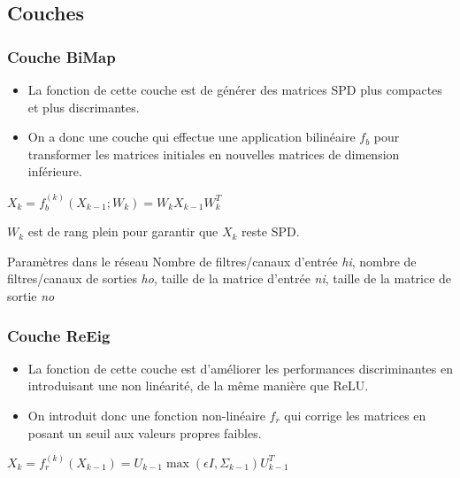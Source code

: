 \documentclass{beamer}
\begin{document}
\subsection{Couches}

\begin{frame}
\frametitle{Couche BiMap}
\begin{itemize}
    \item La fonction de cette couche est de générer des matrices SPD plus compactes et plus discrimantes.
    \item On a donc une couche qui effectue une application bilinéaire $f_b$ pour transformer les matrices initiales en nouvelles matrices de dimension inférieure.
\end{itemize}

\begin{center}
    $ X_k = f_b^{(k)}(X_{k-1};W_k)=W_kX_{k-1}W_k^T$
\end{center}

$W_k$ est de rang plein pour garantir que $X_k$ reste SPD.

\begin{block}{Paramètres dans le réseau}
Nombre de filtres/canaux d'entrée \textit{hi}, nombre de filtres/canaux de sorties \textit{ho}, taille de la matrice d'entrée \textit{ni}, taille de la matrice de sortie \textit{no}
\end{block}


\end{frame}
\begin{frame}
\frametitle{Couche ReEig}
\begin{itemize}
    \item La fonction de cette couche est d'améliorer les performances discriminantes en introduisant une non linéarité, de la même manière que ReLU.
    \item On introduit donc une fonction non-linéaire $f_r$ qui corrige les matrices en posant un seuil aux valeurs propres faibles. 
\end{itemize}

\begin{center}
    $ X_k = f_r^{(k)}(X_{k-1})=U_{k-1}\max(\epsilon I, \Sigma_{k-1})U_{k-1}^T$
\end{center}

\end{frame}
\end{document}
